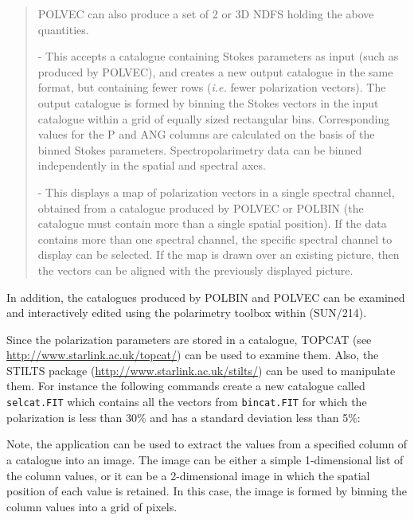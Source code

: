 \documentclass[twoside,11pt]{starlink}
\begin{document}
\begin{quote}
\begin{description}
POLVEC can also produce a set of 2 or 3D NDFS holding the above quantities.

\item [\htmlref{POLBIN}{POLBIN}] - This accepts a catalogue containing Stokes
parameters as input (such as produced by POLVEC), and creates a new
output catalogue in the same format, but containing fewer rows (\emph{i.e.}
fewer polarization vectors). The output catalogue is formed by binning the
Stokes vectors in the input catalogue within a grid of equally sized
rectangular bins. Corresponding values for the P and ANG columns are
calculated on the basis of the binned Stokes parameters.
Spectropolarimetry data can be binned independently in the spatial and
spectral axes.

\item [\htmlref{POLPLOT}{POLPLOT}] - This displays a map of polarization
vectors in a single spectral channel, obtained from a catalogue produced
by POLVEC or POLBIN (the catalogue must contain more than a single
spatial position). If the data contains more than one spectral channel,
the specific spectral channel to display can be selected. If the map is
drawn over an existing picture, then the vectors can be aligned with the
previously displayed picture.

\end{description}
\end{quote}

In addition, the catalogues produced by POLBIN and POLVEC can be examined
and interactively edited using the polarimetry toolbox within
 (SUN/214).

Since the polarization parameters are stored in a catalogue, TOPCAT (see
\url{http://www.starlink.ac.uk/topcat/}) can be used to examine them. Also,
the STILTS package (\url{http://www.starlink.ac.uk/stilts/}) can be
used to manipulate them. For instance the following commands create a new
catalogue called \verb+selcat.FIT+ which contains all the vectors from
\verb+bincat.FIT+ for which the polarization is less than 30\% and has a
standard deviation less than 5\%:

\begin{terminalv}
\end{terminalv}

Note, the  application can be used to extract
the values from a specified column of a catalogue into an image. The image
can be either a simple 1-dimensional list of the column values, or it can
be a 2-dimensional image in which the spatial position of each value is
retained. In this case, the image is formed by binning the column values
into a grid of pixels.
\end{document}
